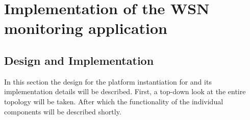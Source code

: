 




	
\section{Implementation of the WSN monitoring application}
\subsection{Design and Implementation}
In this section the design for the platform instantiation for \nedap \sensit and its implementation details will be described. First, a top-down look at the entire topology will be taken. After which the functionality of the individual components will be described shortly.

